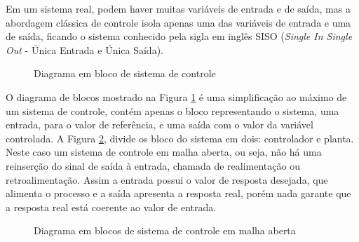 Em um sistema real, podem haver muitas variáveis de entrada e de saída, mas a abordagem clássica de controle isola apenas uma das variáveis de entrada e uma de saída, ficando o sistema conhecido pela sigla em inglês SISO (\emph{Single In Single Out} - Única Entrada e Única Saída).

\begin{figure}[!htb]
\centering
{}
\caption{ Diagrama em bloco de sistema de controle}
\label{fig:processo}
\end{figure}


O diagrama de blocos mostrado na Figura \ref{fig:processo} é uma simplificação ao máximo de um sistema de controle, contém apenas o bloco representando o sistema, uma entrada, para o valor de referência, e uma saída com o valor da variável controlada. A Figura \ref{fig:malhaAberta}, divide os bloco do sistema em dois: controlador e planta. Neste caso um sistema de controle em malha aberta, ou seja, não há uma reinserção do sinal de saída à entrada, chamada de realimentação ou retroalimentação. Assim a entrada possui o valor de resposta desejada, que alimenta o processo e a saída apresenta a resposta real, porém nada garante que a resposta real está coerente ao valor de entrada.

\begin{figure}[!htb]
\centering
{}
\caption{ Diagrama em blocos de sistema de controle em malha aberta}
\label{fig:malhaAberta}
\end{figure}

